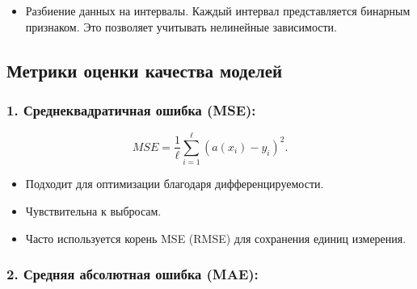 \begin{itemize}
\tightlist
\item
  Разбиение данных на интервалы. Каждый интервал представляется бинарным
  признаком. Это позволяет учитывать нелинейные зависимости.
\end{itemize}

\hypertarget{ux43cux435ux442ux440ux438ux43aux438-ux43eux446ux435ux43dux43aux438-ux43aux430ux447ux435ux441ux442ux432ux430-ux43cux43eux434ux435ux43bux435ux439}{%
\subsection*{Метрики оценки качества
моделей}\label{ux43cux435ux442ux440ux438ux43aux438-ux43eux446ux435ux43dux43aux438-ux43aux430ux447ux435ux441ux442ux432ux430-ux43cux43eux434ux435ux43bux435ux439}}

\hypertarget{ux441ux440ux435ux434ux43dux435ux43aux432ux430ux434ux440ux430ux442ux438ux447ux43dux430ux44f-ux43eux448ux438ux431ux43aux430-mse}{%
\subsubsection*{1. Среднеквадратичная ошибка
(MSE):}\label{ux441ux440ux435ux434ux43dux435ux43aux432ux430ux434ux440ux430ux442ux438ux447ux43dux430ux44f-ux43eux448ux438ux431ux43aux430-mse}}

\begin{equation}
MSE = \frac{1}{\ell} \sum_{i=1}^{\ell} (a(x_i) - y_i)^2.
\end{equation}

\begin{itemize}
\tightlist
\item
  Подходит для оптимизации благодаря дифференцируемости.
\item
  Чувствительна к выбросам.
\item
  Часто используется корень MSE (RMSE) для сохранения единиц измерения.
\end{itemize}

\hypertarget{ux441ux440ux435ux434ux43dux44fux44f-ux430ux431ux441ux43eux43bux44eux442ux43dux430ux44f-ux43eux448ux438ux431ux43aux430-mae}{%
\subsubsection*{2. Средняя абсолютная ошибка
(MAE):}\label{ux441ux440ux435ux434ux43dux44fux44f-ux430ux431ux441ux43eux43bux44eux442ux43dux430ux44f-ux43eux448ux438ux431ux43aux430-mae}}

